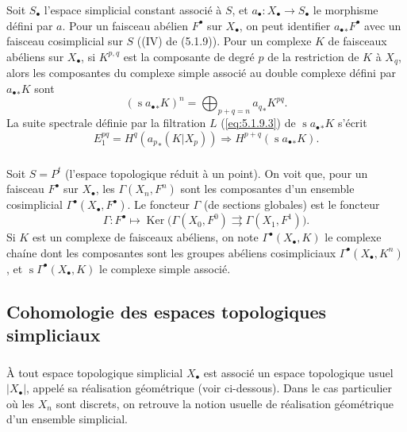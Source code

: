 \documentclass[11pt]{amsart}
\theoremstyle{plain}
\theoremstyle{definition}
\DeclareMathOperator{\Ker}{Ker}
\DeclareMathOperator{\simp}{s}
\newcommand{\Pt}{P^t}
\begin{document}
\subsubsection{}
Soit $S_\bullet$ l'espace simplicial constant associ\'e \`a $S$, et $a_\bullet : X_\bullet \to S_\bullet$ le morphisme d\'efini par $a$.
Pour un faisceau ab\'elien $F^\bullet$ sur $X_\bullet$, on peut identifier ${a_\bullet}_* F^\bullet$ avec un faisceau cosimplicial sur $S$ ((IV) de (5.1.9)). Pour un complexe $K$ de faisceaux ab\'eliens sur $X_\bullet$, si $K^{p,q}$ est la composante de degr\'e $p$ de la restriction de $K$ \`a $X_q$, alors les composantes du complexe simple associ\'e au double complexe d\'efini par ${a_\bullet}_* K$ sont
\begin{equation}\label{eq:5.1.12.1}
(\simp {a_\bullet}_* K)^n = \bigoplus_{p+q=n} {a_q}_* K^{pq}.
\end{equation}
La suite spectrale d\'efinie par la filtration $L$ (\eqref{eq:5.1.9.3}) de $\simp {a_\bullet}_* K$ s'\'ecrit
\begin{equation}\label{eq:5.1.12.2}
E_1^{pq} = H^q({a_p}_*(K|X_p)) \Rightarrow H^{p+q}(\simp {a_\bullet}_* K).
\end{equation}

\subsubsection{}
Soit $S = \Pt$ (l'espace topologique r\'eduit \`a un point). On voit que, pour un faisceau $F^\bullet$ sur $X_\bullet$, les $\Gamma(X_n, F^n)$ sont les composantes d'un ensemble cosimplicial $\Gamma^\bullet(X_\bullet, F^\bullet)$. Le foncteur $\Gamma$ (de sections globales) est le foncteur
\begin{equation}\label{eq:5.1.13.1}
\Gamma : F^\bullet \mapsto \Ker\big(\Gamma(X_0, F^0) \rightrightarrows \Gamma(X_1, F^1)\big).
\end{equation}
Si $K$ est un complexe de faisceaux ab\'eliens, on note $\Gamma^\bullet(X_\bullet, K)$ le complexe cha\'ine dont les composantes sont les groupes ab\'eliens cosimpliciaux $\Gamma^\bullet(X_\bullet, K^n)$, et $\simp \Gamma^\bullet(X_\bullet, K)$ le complexe simple associ\'e.

\subsection{Cohomologie des espaces topologiques simpliciaux}

\subsubsection{}
\`A tout espace topologique simplicial $X_\bullet$ est associ\'e un espace topologique usuel $|X_\bullet|$, appel\'e sa r\'ealisation g\'eom\'etrique (voir ci-dessous). Dans le cas particulier o\`u les $X_n$ sont discrets, on retrouve la notion usuelle de r\'ealisation g\'eom\'etrique d'un ensemble simplicial.
\end{document}
